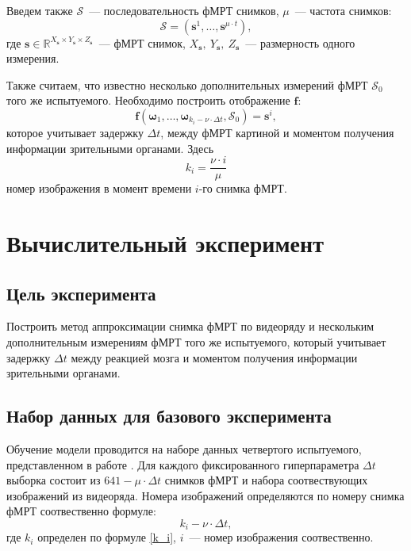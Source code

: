 \documentclass[12pt,twoside]{article}
\begin{document}
Введем также $\mathcal{S}$~--- последовательность фМРТ снимков,  $\mu$~--- частота снимков:
\begin{equation}
    \mathcal{S} = (\bm{s}^{1}, \dots, \bm{s}^{\mu \cdot t}),
\end{equation}
где $\bm{s} \in \mathbb{R}^{X_{\bm{s}} \times Y_{\bm{s}} \times Z_{\bm{s}}}$~--- фМРТ снимок, $X_{\bm{s}},~Y_{\bm{s}},~Z_{\bm{s}}$~--- размерность одного измерения.

Также считаем, что известно несколько дополнительных измерений фМРТ $\mathcal{S}_0$ того же испытуемого.
Необходимо построить отображение $\bm{f}$:
\begin{equation}
    \bm{f}(\bm{\omega}_{1}, \dots, \bm{\omega}_{k_i - \nu \cdot \Delta t}, \mathcal{S}_0) = \bm{s}^i,
\end{equation}
которое учитывает задержку $\Delta t$, между фМРТ картиной и моментом получения информации зрительными органами.
Здесь
\begin{equation}
    \label{k_i}
    k_i = \dfrac{\nu \cdot i}{\mu}
\end{equation}
номер изображения в момент времени $i$-го снимка фМРТ.
\section{Вычислительный эксперимент}
\subsection{Цель эксперимента}
Построить метод аппроксимации снимка фМРТ по видеоряду и нескольким дополнительным измерениям фМРТ того же испытуемого, который 
учитывает задержку $\Delta t$ между реакцией мозга и моментом получения информации зрительными органами. 
\subsection{Набор данных для базового эксперимента}
Обучение модели проводится на наборе данных четвертого испытуемого, представленном в работе \citep{Berezutskaya2022}. 
Для каждого фиксированного гиперпараметра $\Delta t$ выборка состоит из $641-\mu \cdot \Delta t$  снимков фМРТ и набора соотвествующих изображений из видеоряда. 
Номера изображений определяются по номеру снимка фМРТ соотвественно формуле:
\begin{equation}
    k_i - \nu \cdot \Delta t,
\end{equation}
где $k_i$ определен по формуле \eqref{k_i}, $i$~--- номер изображения соотвественно.
  
\end{document}
